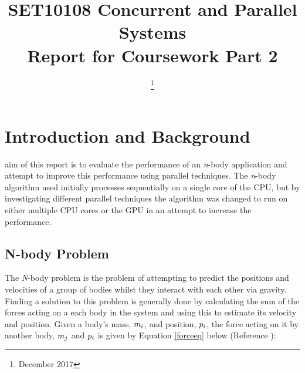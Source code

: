 \documentclass[12pt,journal,transmag]{IEEEtran}
\begin{document}
	
	\title{SET10108 Concurrent and Parallel Systems\\Report for Coursework Part 2}
	
	\author{
		
		\thanks{December 2017}}
	
	
	
	
	\maketitle
	
	\IEEEdisplaynontitleabstractindextext
	
	\IEEEpeerreviewmaketitle
	
	\section{Introduction and Background}
	 aim of this report is to evaluate the performance of an \textit{n}-body application and attempt to improve this performance using parallel techniques. The \textit{n}-body algorithm used initially processes sequentially on a single core of the CPU, but by investigating different parallel techniques the algorithm was changed to run on either multiple CPU cores or the GPU in an attempt to increase the performance.
	
	\subsection{N-body Problem}
	The \textit{N}-body problem is the problem of attempting to predict the positions and velocities of a group of bodies whilst they interact with each other via gravity. Finding a solution to this problem is generally done by calculating the sum of the forces acting on a each body in the system and using this to estimate its velocity and position. Given a body's mass, $m\textsubscript{$i$}$, and position, $p\textsubscript{$i$}$, the force acting on it by another body, $m\textsubscript{$j$}$ and $p\textsubscript{$i$}$ is given by Equation \ref{forceeq} below (Reference \cite{meyer}):
	
\end{document}
